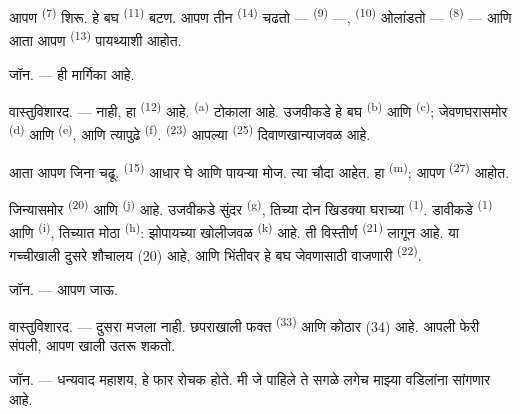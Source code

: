आपण  \textsuperscript{(7)} शिरू. हे बघ 
\textsuperscript{(11)} बटण. आपण तीन  \textsuperscript{(14)} चढतो —
 \textsuperscript{(9)} —,  \textsuperscript{(10)} ओलांडतो —
 \textsuperscript{(8)} — आणि आता आपण 
\textsuperscript{(13)} पायथ्याशी आहोत.

\textsc{जॉन}. --- ही मार्गिका आहे.

\textsc{वास्तुविशारद}. --- नाही, हा  \textsuperscript{(12)} आहे.
 \textsuperscript{(a)} टोकाला आहे. उजवीकडे हे बघ 
\textsuperscript{(b)} आणि  \textsuperscript{(c)}; जेवणघरासमोर
 \textsuperscript{(d)} आणि  \textsuperscript{(e)},
आणि त्यापुढे  \textsuperscript{(f)}. 
\textsuperscript{(23)} आपल्या  \textsuperscript{(25)} दिवाणखान्याजवळ
आहे.

आता आपण जिना चढू.  \textsuperscript{(15)} आधार घे आणि पायऱ्या मोज. त्या चौदा
आहेत. हा  \textsuperscript{(m)}; आपण 
\textsuperscript{(27)} आहोत.

\VUsaut{3.0mm}
\VUsaut{3.0mm}

जिन्यासमोर  \textsuperscript{(20)} आणि 
\textsuperscript{(j)} आहे. उजवीकडे सुंदर  \textsuperscript{(g)}, तिच्या
दोन खिडक्या घराच्या  \textsuperscript{(1)}. डावीकडे 
\textsuperscript{(1)} आणि  \textsuperscript{(i)}, तिच्यात मोठा
 \textsuperscript{(h)}: झोपायच्या खोलीजवळ 
\textsuperscript{(k)} आहे. ती विस्तीर्ण  \textsuperscript{(21)} लागून आहे. या
गच्चीखाली दुसरे शौचालय (20) आहे, आणि भिंतीवर हे बघ जेवणासाठी वाजणारी 
\textsuperscript{(22)}.

\textsc{जॉन}. --- आपण  जाऊ.

\textsc{वास्तुविशारद}. --- दुसरा मजला नाही. छपराखाली फक्त 
\textsuperscript{(33)} आणि कोठार (34) आहे. आपली फेरी संपली, आपण खाली उतरू शकतो.

\textsc{जॉन}. --- धन्यवाद महाशय, हे फार रोचक होते. मी जे पाहिले ते सगळे लगेच माझ्या वडिलांना
सांगणार आहे.

\VUsaut{4.0mm}
\VUfilet{22mm}
